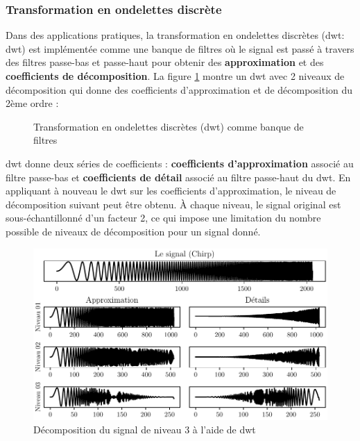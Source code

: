\subsubsection{Transformation en ondelettes discrète}%
\label{subsub:transformation_en_ondelettes_discretes}

Dans des applications pratiques, la transformation en ondelettes discrètes (\acrlong{dwt}: \acrshort{dwt}) est implémentée comme une banque de filtres où le signal est passé à travers des filtres passe-bas et passe-haut pour obtenir des \textbf{approximation} et des \textbf{coefficients de décomposition}. La figure \ref{fig:dwt} montre un \acrshort{dwt} avec 2 niveaux de décomposition qui donne des coefficients d'approximation et de décomposition du 2ème ordre :

\begin{figure}[H]
    \centering
    
    \caption{Transformation en ondelettes discrètes (\acrshort{dwt}) comme banque de filtres}
    \label{fig:dwt}
\end{figure}

\acrshort{dwt} donne deux séries de coefficients : \textbf{coefficients d'approximation} associé au filtre passe-bas et \textbf{coefficients de détail} associé au filtre passe-haut du \acrshort{dwt}. En appliquant à nouveau le \acrshort{dwt} sur les coefficients d'approximation, le niveau de décomposition suivant peut être obtenu. À chaque niveau, le signal original est sous-échantillonné d'un facteur 2, ce qui impose une limitation du nombre possible de niveaux de décomposition pour un signal donné.

\begin{figure}[h]
    \centering
    \includegraphics{figures/dwt_chirp_fr.pdf}
    \caption{Décomposition du signal de niveau 3 à l'aide de \acrshort{dwt}}
    \label{fig:dwt-chirp-signal}
\end{figure}

